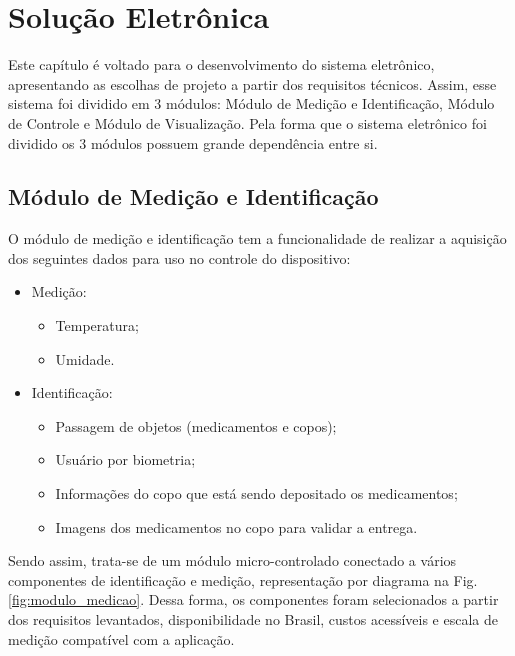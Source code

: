 \chapter[Solução Eletrônica]{Solução Eletrônica}

Este capítulo é voltado para o desenvolvimento do sistema eletrônico, apresentando as escolhas de projeto a partir dos requisitos técnicos. Assim, esse sistema foi dividido em 3 módulos: Módulo de Medição e Identificação, Módulo de Controle e Módulo de Visualização. Pela forma que o sistema eletrônico foi dividido os 3 módulos possuem grande dependência entre si.

\section{Módulo de Medição e Identificação}

O módulo de medição e identificação tem a funcionalidade de realizar a aquisição dos seguintes dados para uso no controle do dispositivo:

\begin{itemize}
    \item Medição:
    \begin{itemize}
        \item Temperatura;
        \item Umidade.
    \end{itemize}
    \item Identificação:
    \begin{itemize}
        \item Passagem de objetos (medicamentos e copos);
        \item Usuário por biometria;
        \item Informações do copo que está sendo depositado os medicamentos;
        \item Imagens dos medicamentos no copo para validar a entrega.
    \end{itemize}
\end{itemize}

Sendo assim, trata-se de um módulo micro-controlado conectado a vários componentes de identificação e medição, representação por diagrama na Fig. \ref{fig:modulo_medicao}. Dessa forma, os componentes foram selecionados a partir dos requisitos levantados, disponibilidade no Brasil, custos acessíveis e escala de medição compatível com a aplicação. 


